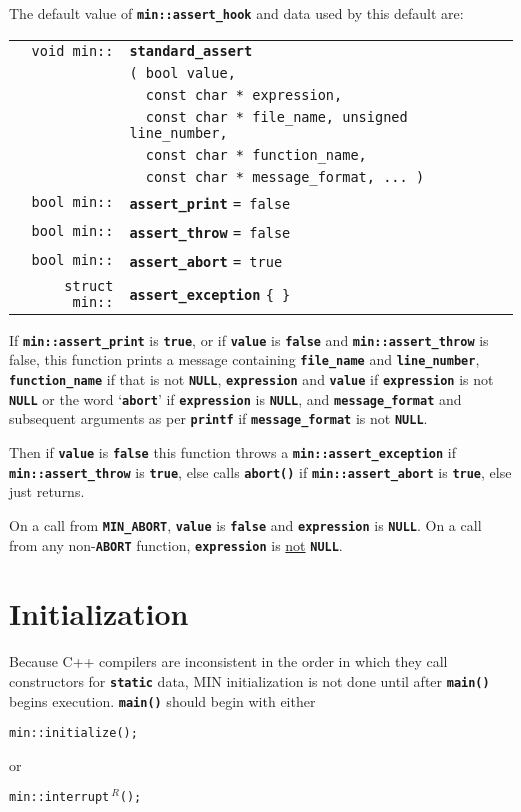 \documentclass[12pt]{article}
\makeatletter
\newcommand{\TT}[1]{{\tt \bfseries #1}}
\newcommand{\ttindex}[1]{\index{#1@{\tt #1}}}
\newcommand{\EOL}{\penalty \exhyphenpenalty}
\newenvironment{indpar}[1][0.3in]%
	{\begin{list}{}%
		     {\setlength{\itemsep}{0in}%
		      \setlength{\topsep}{0in}%
		      \setlength{\parsep}{1ex}%
		      \setlength{\labelwidth}{#1}%
		      \setlength{\leftmargin}{#1}%
		      \addtolength{\leftmargin}{\labelsep}}%
	 \item}%
	{\end{list}}
\newcommand{\LABEL}[1]{\label{#1}}
\newlength{\ARGBREAKLENGTH}
\newcommand{\ARGBREAK}[1][\ARGBREAKLENGTH]{\\&\hspace*{#1}}
\newcommand{\MINKEY}[1]%
	   {\TT{#1}\ttindex{min::#1}\ttindex{#1}}
\newcommand{\REL}{$\,^R$}
\makeatother
\begin{document}
The default value of \TT{min::assert\_hook} and data
used by this default are:

\begin{indpar}\begin{tabular}{r@{}l}
\verb|void min::| & \MINKEY{standard\_assert}\ARGBREAK
    \verb|( bool value,|\ARGBREAK
    \verb|  const char * expression,|\ARGBREAK
    \verb|  const char * file_name, unsigned line_number,|\ARGBREAK
    \verb|  const char * function_name,|\ARGBREAK
    \verb|  const char * message_format, ... )|
\LABEL{MIN::STANDARD_ASSERT} \\
\verb|bool min::| & \MINKEY{assert\_print} \verb|= false|
\LABEL{MIN::ASSERT_PRINT} \\
\verb|bool min::| & \MINKEY{assert\_throw} \verb|= false|
\LABEL{MIN::ASSERT_THROW} \\
\verb|bool min::| & \MINKEY{assert\_abort} \verb|= true|
\LABEL{MIN::ASSERT_ABORT} \\
\verb|struct min::| & \MINKEY{assert\_exception} \verb|{ }|
\LABEL{MIN::ASSERT_EXCEPTION} \\
\end{tabular}\end{indpar}

If \TT{min::assert\_print} is \TT{true}, or if
\TT{value} is \TT{false} and \TT{min::\EOL assert\_\EOL throw}
is false, this function prints a message containing
\TT{file\_\EOL name} and \TT{line\_\EOL number},
\TT{function\_\EOL name} if that is not \TT{NULL},
\TT{expression} and \TT{value} if \TT{expression} is not \TT{NULL}
or the word `\TT{abort}' if \TT{expression} is \TT{NULL},
and \TT{message\_\EOL format} and subsequent arguments
as per \TT{printf} if \TT{message\_\EOL format} is not \TT{NULL}.

Then if \TT{value} is \TT{false} this function throws a
\TT{min::\EOL assert\_\EOL exception} if 
\TT{min::\EOL assert\_\EOL throw} is \TT{true}, else
calls \TT{abort()} if \TT{min::\EOL assert\_\EOL abort} is \TT{true},
else just returns.

On a call from \TT{MIN\_ABORT}, \TT{value} is \TT{false} and
\TT{expression} is \TT{NULL}.  On a call from any non-\TT{ABORT}
function, \TT{expression} is \underline{not} \TT{NULL}.


\section{Initialization}

Because C++ compilers are inconsistent in the order in which they
call constructors for \TT{static} data, MIN initialization is
not done until after \TT{main()} begins execution.  \TT{main()}
should begin with either
\begin{center}
\tt min::initialize();
\end{center}
or
\begin{center}
\tt min::interrupt\REL();
\end{center}
\end{document}

